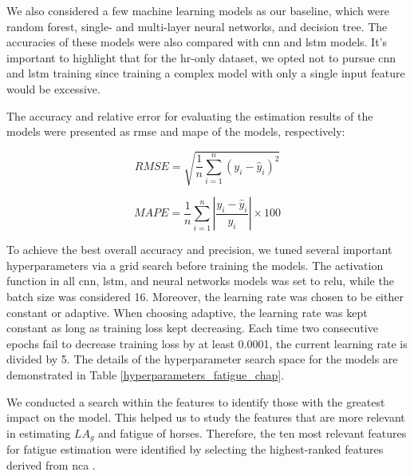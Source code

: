 We also considered a few machine learning models as our baseline, which were random forest, single- and multi-layer neural networks, and decision tree. The accuracies of these models were also compared with \gls{cnn} and \gls{lstm} models. It's important to highlight that for the \gls{hr}-only dataset, we opted not to pursue \gls{cnn} and \gls{lstm} training since training a complex model with only a single input feature would be excessive.

The accuracy and relative error for evaluating the estimation results of the models were presented as \gls{rmse} and \gls{mape} of the models, respectively: 

\begin{equation}RMSE = \sqrt{\dfrac{1}{n}\sum_{i=1}^{n}(y_i - \hat{y}_i)^2}\end{equation}

\begin{equation}MAPE=\dfrac{1}{n}\sum_{i=1}^{n}\left|\dfrac{y_i - \hat{y}_i}{y_i}\right|\times 100\end{equation}

To achieve the best overall accuracy and precision, we tuned several important hyperparameters via a grid search before training the models. The activation function in all \gls{cnn}, \gls{lstm}, and neural networks models was set to \gls{relu}, while the batch size was considered 16. Moreover, the learning rate was chosen to be either constant or adaptive. When choosing adaptive, the learning rate was kept constant as long as training loss kept decreasing. Each time two consecutive epochs fail to decrease training loss by at least 0.0001, the current learning rate is divided by 5. The details of the hyperparameter search space for the models are demonstrated in Table \ref{hyperparameters_fatigue_chap}.



We conducted a search within the features to identify those with the greatest impact on the model. This helped us to study the features that are more relevant in estimating $LA_g$ and fatigue of horses. Therefore, the ten most relevant features for fatigue estimation were identified by selecting the highest-ranked features derived from \gls{nca} \cite{10.5555/2976040.2976105}.


